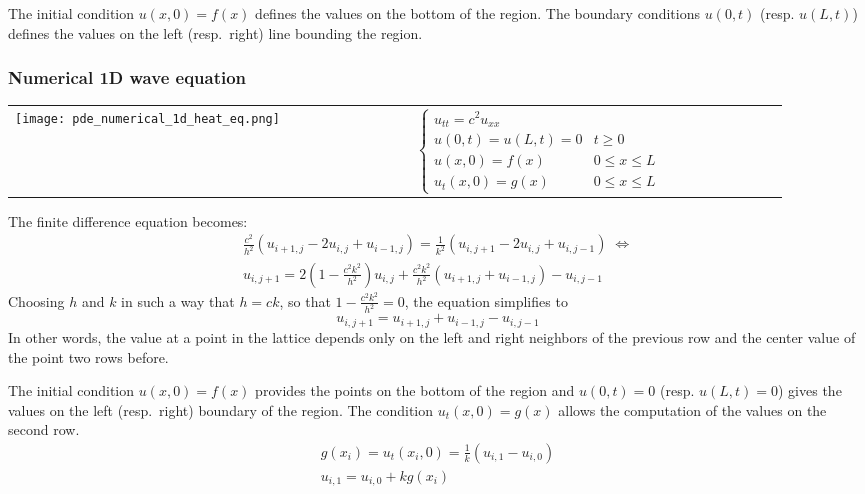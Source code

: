 The initial condition $u(x, 0) = f(x)$ defines the values on the bottom of the region. The boundary conditions $u(0, t)$ (resp. $u(L, t)$) defines the values on the left (resp.\ right) line bounding the region.

\subsubsection{Numerical 1D wave equation}

\begin{tabular}{ m{0.33\linewidth}  m{0.57\linewidth} }
    {
        \texttt{[image: pde\_numerical\_1d\_heat\_eq.png]}
    }
     &
    {
            \begin{equation*}
                \begin{cases}
                    u_{tt}=c^2u_{xx}                \\
                    u(0,t)=u(L,t)=0 & t\geq0        \\
                    u(x,0)=f(x)     & 0\leq x\leq L \\
                    u_t(x,0)=g(x)   & 0\leq x\leq L
                \end{cases}
            \end{equation*}
        }
\end{tabular}

The finite difference equation becomes:
\begin{gather*}
    \frac{c^2}{h^2}(u_{i+1,j}-2u_{i,j}+u_{i-1,j})=\frac{1}{k^2}(u_{i,j+1}-2u_{i,j}+u_{i,j-1}) \; \Leftrightarrow \\
    u_{i,j+1}=2\left(1-\frac{c^2k^2}{h^2}\right)u_{i,j}+\frac{c^2k^2}{h^2}(u_{i+1,j}+u_{i-1,j})-u_{i,j-1}
\end{gather*}
Choosing $h$ and $k$ in such a way that $h=ck$, so that $1 - \frac{c^2k^2}{h^2} = 0$, the equation simplifies to
\begin{equation*}
    u_{i,j+1}=u_{i+1,j}+u_{i-1,j}-u_{i,j-1}
\end{equation*}
In other words, the value at a point in the lattice depends only on the left and right neighbors of the previous row and the center value of the point two rows before.

The initial condition $u(x, 0) = f(x)$ provides the points on the bottom of the region and $u(0, t) = 0$ (resp. $u(L, t) = 0$) gives the values on the left (resp.\ right) boundary of the region. The condition $u_t(x, 0) = g(x)$ allows the computation of the values on the second row.
\begin{gather*}
    g(x_i)=u_t(x_i,0)=\frac{1}{k}(u_{i,1}-u_{i,0}) \\
    u_{i,1}=u_{i,0}+kg(x_i)
\end{gather*}

